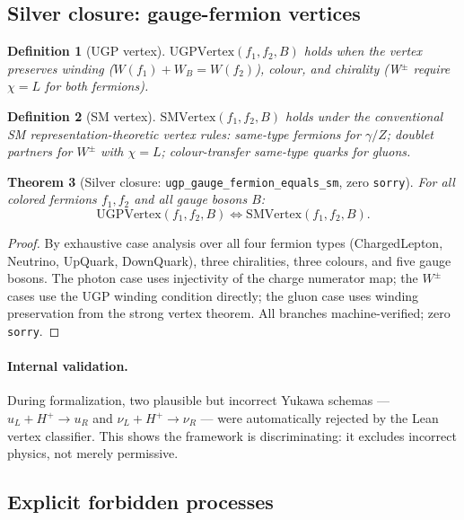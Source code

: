 \documentclass[12pt]{article}
\newtheorem{theorem}{Theorem}[section]
\newtheorem{definition}[theorem]{Definition}
\theoremstyle{remark}
\newcommand{\sorry}{\texttt{sorry}}
\newcommand{\lean}[1]{\texttt{#1}}
\begin{document}
\subsection{Silver closure: gauge-fermion vertices}

\begin{definition}[UGP vertex]
$\mathrm{UGPVertex}(f_1, f_2, B)$ holds when the vertex preserves winding
($W(f_1) + W_B = W(f_2)$), colour, and chirality (W$^\pm$ require
$\chi = L$ for both fermions).
\end{definition}

\begin{definition}[SM vertex]
$\mathrm{SMVertex}(f_1, f_2, B)$ holds under the conventional SM
representation-theoretic vertex rules: same-type fermions for $\gamma/Z$;
doublet partners for $W^\pm$ with $\chi = L$; colour-transfer same-type quarks
for gluons.
\end{definition}

\begin{theorem}[Silver closure: \lean{ugp\_gauge\_fermion\_equals\_sm}, zero \sorry]
\label{thm:silver}
For all colored fermions $f_1, f_2$ and all gauge bosons $B$:
\begin{equation}
  \mathrm{UGPVertex}(f_1, f_2, B) \iff \mathrm{SMVertex}(f_1, f_2, B).
\end{equation}
\end{theorem}

\begin{proof}
By exhaustive case analysis over all four fermion types (ChargedLepton,
Neutrino, UpQuark, DownQuark), three chiralities, three colours, and five
gauge bosons.  The photon case uses injectivity of the charge numerator map;
the $W^\pm$ cases use the UGP winding condition directly; the gluon case uses
winding preservation from the strong vertex theorem.  All branches
machine-verified; zero \sorry.
\end{proof}

\paragraph{Internal validation.}
During formalization, two plausible but incorrect Yukawa schemas ---
$u_L + H^+ \to u_R$ and $\nu_L + H^+ \to \nu_R$ --- were automatically
rejected by the Lean vertex classifier.  This shows the framework is
discriminating: it excludes incorrect physics, not merely permissive.

\subsection{Explicit forbidden processes}
\end{document}
